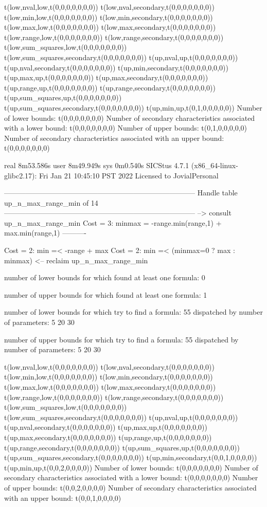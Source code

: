 t(low,nval,low,t(0,0,0,0,0,0,0))
t(low,nval,secondary,t(0,0,0,0,0,0,0))
t(low,min,low,t(0,0,0,0,0,0,0))
t(low,min,secondary,t(0,0,0,0,0,0,0))
t(low,max,low,t(0,0,0,0,0,0,0))
t(low,max,secondary,t(0,0,0,0,0,0,0))
t(low,range,low,t(0,0,0,0,0,0,0))
t(low,range,secondary,t(0,0,0,0,0,0,0))
t(low,sum_squares,low,t(0,0,0,0,0,0,0))
t(low,sum_squares,secondary,t(0,0,0,0,0,0,0))
t(up,nval,up,t(0,0,0,0,0,0,0))
t(up,nval,secondary,t(0,0,0,0,0,0,0))
t(up,min,secondary,t(0,0,0,0,0,0,0))
t(up,max,up,t(0,0,0,0,0,0,0))
t(up,max,secondary,t(0,0,0,0,0,0,0))
t(up,range,up,t(0,0,0,0,0,0,0))
t(up,range,secondary,t(0,0,0,0,0,0,0))
t(up,sum_squares,up,t(0,0,0,0,0,0,0))
t(up,sum_squares,secondary,t(0,0,0,0,0,0,0))
t(up,min,up,t(0,1,0,0,0,0,0))
Number of lower bounds:                                             t(0,0,0,0,0,0,0)
Number of secondary characteristics associated with a lower bound:  t(0,0,0,0,0,0,0)
Number of upper bounds:                                             t(0,1,0,0,0,0,0)
Number of secondary characteristics associated with an upper bound: t(0,0,0,0,0,0,0)

real	8m53.586s
user	8m49.949s
sys	0m0.540s
SICStus 4.7.1 (x86_64-linux-glibc2.17): Fri Jan 21 10:45:10 PST 2022
Licensed to JovialPersonal


--------------------------------------------------------------------------------
Handle table up_n_max_range_min of 14
--------------------------------------------------------------------------------
--> consult up_n_max_range_min
Cost =  3:  minmax = -range.min(range,1) + max.min(range,1)
----------

Cost =  2:  min =< -range + max
Cost =  2:  min =< (minmax=0 ? max : minmax)
<-- reclaim up_n_max_range_min

number of lower bounds for which found at least one formula: 0

number of upper bounds for which found at least one formula: 1

number of lower bounds for which try to find a formula: 55
dispatched by number of parameters: 5  20  30

number of upper bounds for which try to find a formula: 55
dispatched by number of parameters: 5  20  30

t(low,nval,low,t(0,0,0,0,0,0,0))
t(low,nval,secondary,t(0,0,0,0,0,0,0))
t(low,min,low,t(0,0,0,0,0,0,0))
t(low,min,secondary,t(0,0,0,0,0,0,0))
t(low,max,low,t(0,0,0,0,0,0,0))
t(low,max,secondary,t(0,0,0,0,0,0,0))
t(low,range,low,t(0,0,0,0,0,0,0))
t(low,range,secondary,t(0,0,0,0,0,0,0))
t(low,sum_squares,low,t(0,0,0,0,0,0,0))
t(low,sum_squares,secondary,t(0,0,0,0,0,0,0))
t(up,nval,up,t(0,0,0,0,0,0,0))
t(up,nval,secondary,t(0,0,0,0,0,0,0))
t(up,max,up,t(0,0,0,0,0,0,0))
t(up,max,secondary,t(0,0,0,0,0,0,0))
t(up,range,up,t(0,0,0,0,0,0,0))
t(up,range,secondary,t(0,0,0,0,0,0,0))
t(up,sum_squares,up,t(0,0,0,0,0,0,0))
t(up,sum_squares,secondary,t(0,0,0,0,0,0,0))
t(up,min,secondary,t(0,0,1,0,0,0,0))
t(up,min,up,t(0,0,2,0,0,0,0))
Number of lower bounds:                                             t(0,0,0,0,0,0,0)
Number of secondary characteristics associated with a lower bound:  t(0,0,0,0,0,0,0)
Number of upper bounds:                                             t(0,0,2,0,0,0,0)
Number of secondary characteristics associated with an upper bound: t(0,0,1,0,0,0,0)

